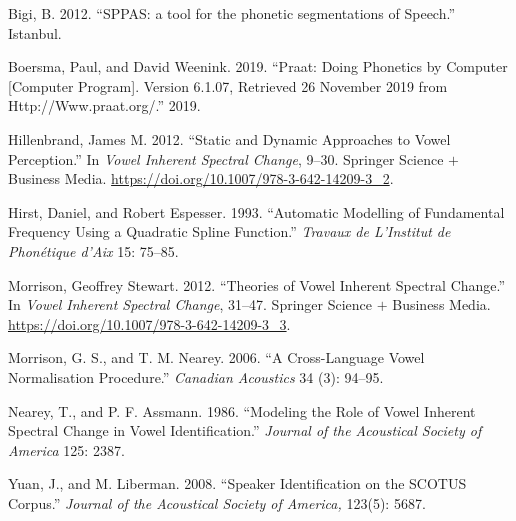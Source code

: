 \documentclass[
  10pt,
]{article}
\newlength{\cslhangindent}
\newenvironment{cslreferences}%
  {\setlength{\parindent}{0pt}%
  \everypar{\setlength{\hangindent}{\cslhangindent}}\ignorespaces}%
  {\par}
\begin{document}
\hypertarget{refs}{}
\begin{cslreferences}
\leavevmode\hypertarget{ref-sppas2012}{}%
Bigi, B. 2012. ``SPPAS: a tool for the phonetic segmentations of Speech.'' Istanbul.

\leavevmode\hypertarget{ref-praat}{}%
Boersma, Paul, and David Weenink. 2019. ``Praat: Doing Phonetics by Computer {[}Computer Program{]}. Version 6.1.07, Retrieved 26 November 2019 from Http://Www.praat.org/.'' 2019.

\leavevmode\hypertarget{ref-hillenbrand2012}{}%
Hillenbrand, James M. 2012. ``Static and Dynamic Approaches to Vowel Perception.'' In \emph{Vowel Inherent Spectral Change}, 9--30. Springer Science \(+\) Business Media. \url{https://doi.org/10.1007/978-3-642-14209-3_2}.

\leavevmode\hypertarget{ref-hirst1993}{}%
Hirst, Daniel, and Robert Espesser. 1993. ``Automatic Modelling of Fundamental Frequency Using a Quadratic Spline Function.'' \emph{Travaux de L'Institut de Phonétique d'Aix} 15: 75--85.

\leavevmode\hypertarget{ref-morrison2012}{}%
Morrison, Geoffrey Stewart. 2012. ``Theories of Vowel Inherent Spectral Change.'' In \emph{Vowel Inherent Spectral Change}, 31--47. Springer Science \(+\) Business Media. \url{https://doi.org/10.1007/978-3-642-14209-3_3}.

\leavevmode\hypertarget{ref-morrison2006}{}%
Morrison, G. S., and T. M. Nearey. 2006. ``A Cross-Language Vowel Normalisation Procedure.'' \emph{Canadian Acoustics} 34 (3): 94--95.

\leavevmode\hypertarget{ref-nearey1986}{}%
Nearey, T., and P. F. Assmann. 1986. ``Modeling the Role of Vowel Inherent Spectral Change in Vowel Identification.'' \emph{Journal of the Acoustical Society of America} 125: 2387.

\leavevmode\hypertarget{ref-p2fa}{}%
Yuan, J., and M. Liberman. 2008. ``Speaker Identification on the SCOTUS Corpus.'' \emph{Journal of the Acoustical Society of America,} 123(5): 5687.
\end{cslreferences}
\end{document}
